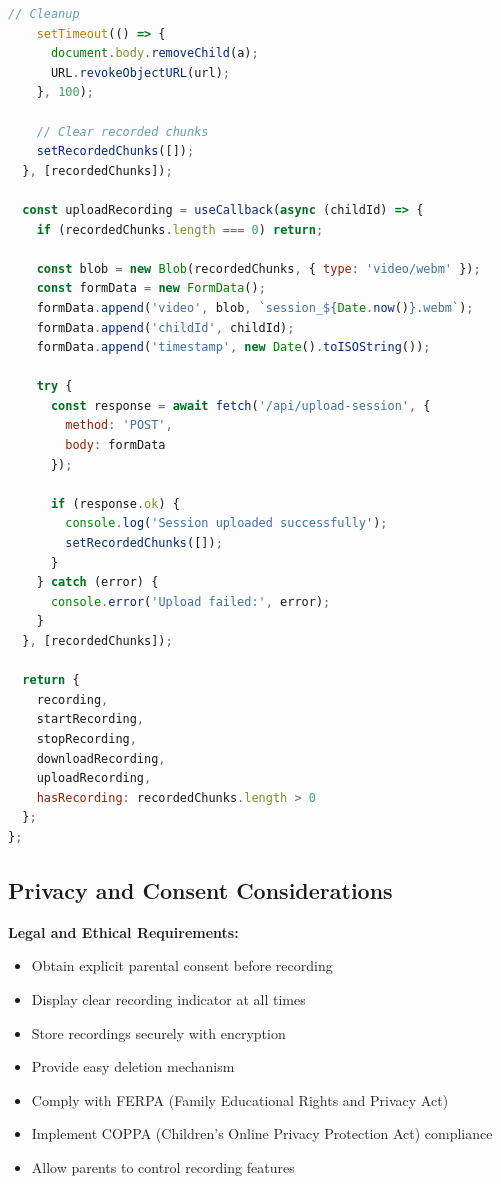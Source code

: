 \documentclass[12pt, a4paper]{article}
\begin{document}
\begin{lstlisting}[language=JavaScript, caption=Custom Recording Hook]
    // Cleanup
    setTimeout(() => {
      document.body.removeChild(a);
      URL.revokeObjectURL(url);
    }, 100);
    
    // Clear recorded chunks
    setRecordedChunks([]);
  }, [recordedChunks]);
  
  const uploadRecording = useCallback(async (childId) => {
    if (recordedChunks.length === 0) return;
    
    const blob = new Blob(recordedChunks, { type: 'video/webm' });
    const formData = new FormData();
    formData.append('video', blob, `session_${Date.now()}.webm`);
    formData.append('childId', childId);
    formData.append('timestamp', new Date().toISOString());
    
    try {
      const response = await fetch('/api/upload-session', {
        method: 'POST',
        body: formData
      });
      
      if (response.ok) {
        console.log('Session uploaded successfully');
        setRecordedChunks([]);
      }
    } catch (error) {
      console.error('Upload failed:', error);
    }
  }, [recordedChunks]);
  
  return {
    recording,
    startRecording,
    stopRecording,
    downloadRecording,
    uploadRecording,
    hasRecording: recordedChunks.length > 0
  };
};
\end{lstlisting}

\subsection{Privacy and Consent Considerations}

\begin{tcolorbox}[colback=warningorange!10, colframe=warningorange, title=Important Privacy Guidelines]
\textbf{Legal and Ethical Requirements:}
\begin{itemize}[leftmargin=*]
    \item Obtain explicit parental consent before recording
    \item Display clear recording indicator at all times
    \item Store recordings securely with encryption
    \item Provide easy deletion mechanism
    \item Comply with FERPA (Family Educational Rights and Privacy Act)
    \item Implement COPPA (Children's Online Privacy Protection Act) compliance
    \item Allow parents to control recording features
\end{itemize}
\end{tcolorbox}
\end{document}
